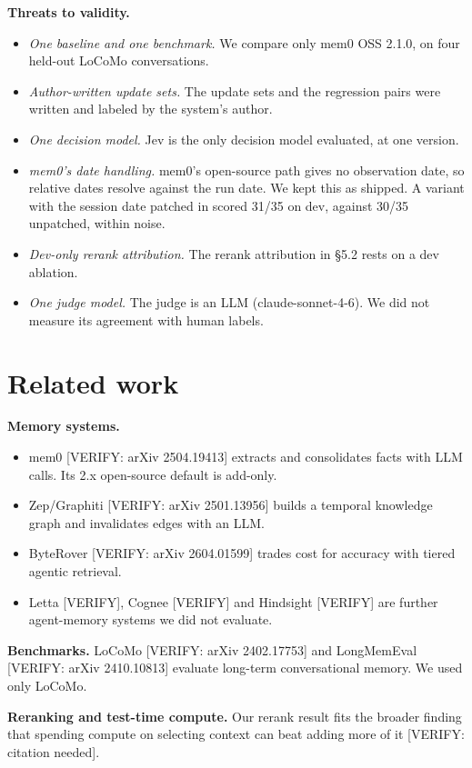 \documentclass[11pt]{article}
\newcommand{\src}[1]{}
\begin{document}
\textbf{Threats to validity.}

\begin{itemize}
\item \emph{One baseline and one benchmark.} We compare only mem0 OSS 2.1.0, on four held-out LoCoMo conversations.
\item \emph{Author-written update sets.} The update sets and the regression pairs were written and labeled by the system's author.
\item \emph{One decision model.} Jev is the only decision model evaluated, at one version.
\item \emph{mem0's date handling.} mem0's open-source path gives no observation date, so relative dates resolve against the run date. We kept this as shipped. A variant with the session date patched in scored 31/35\src{bench/results/mem0_dated__dev.json} on dev, against 30/35\src{bench/results/mem0__dev.json} unpatched, within noise.
\item \emph{Dev-only rerank attribution.} The rerank attribution in \S{}5.2 rests on a dev ablation.
\item \emph{One judge model.} The judge is an LLM (claude-sonnet-4-6). We did not measure its agreement with human labels.
\end{itemize}
\section{Related work}
\textbf{Memory systems.}

\begin{itemize}
\item mem0 [VERIFY: arXiv 2504.19413] extracts and consolidates facts with LLM calls. Its 2.x open-source default is add-only.
\item Zep/Graphiti [VERIFY: arXiv 2501.13956] builds a temporal knowledge graph and invalidates edges with an LLM.
\item ByteRover [VERIFY: arXiv 2604.01599] trades cost for accuracy with tiered agentic retrieval.
\item Letta [VERIFY], Cognee [VERIFY] and Hindsight [VERIFY] are further agent-memory systems we did not evaluate.
\end{itemize}
\textbf{Benchmarks.} LoCoMo [VERIFY: arXiv 2402.17753] and LongMemEval [VERIFY: arXiv 2410.10813] evaluate long-term conversational memory. We used only LoCoMo.

\textbf{Reranking and test-time compute.} Our rerank result fits the broader finding that spending compute on selecting context can beat adding more of it [VERIFY: citation needed].
\end{document}
